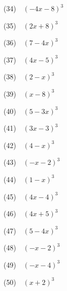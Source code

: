 \documentclass[a4j,twocolumn,10pt,fleqn]{jarticle}
\begin{document}
(34)~~$\left(- 4 x - 8\right)^{3}$

(35)~~$\left(2 x + 8\right)^{3}$

(36)~~$\left(7 - 4 x\right)^{3}$

(37)~~$\left(4 x - 5\right)^{3}$

(38)~~$\left(2 - x\right)^{3}$

(39)~~$\left(x - 8\right)^{3}$

(40)~~$\left(5 - 3 x\right)^{3}$

(41)~~$\left(3 x - 3\right)^{3}$

(42)~~$\left(4 - x\right)^{3}$

(43)~~$\left(- x - 2\right)^{3}$

(44)~~$\left(1 - x\right)^{3}$

(45)~~$\left(4 x - 4\right)^{3}$

(46)~~$\left(4 x + 5\right)^{3}$

(47)~~$\left(5 - 4 x\right)^{3}$

(48)~~$\left(- x - 2\right)^{3}$

(49)~~$\left(- x - 4\right)^{3}$

(50)~~$\left(x + 2\right)^{3}$
\end{document}
